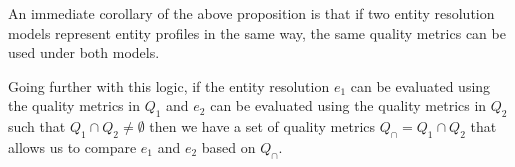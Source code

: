 An immediate corollary of the above proposition is that if two entity resolution
models represent entity profiles in the same way, the same quality metrics can
be used under both models.

Going further with this logic, if the entity resolution $e_1$ can be evaluated
using the quality metrics in $Q_1$ and $e_2$ can be evaluated using the quality
metrics in $Q_2$ such that $Q_1 \cap Q_2 \neq \emptyset$ then we have a set of
quality metrics $Q_\cap = Q_1 \cap Q_2$ that allows us to compare $e_1$ and
$e_2$ based on $Q_\cap$.